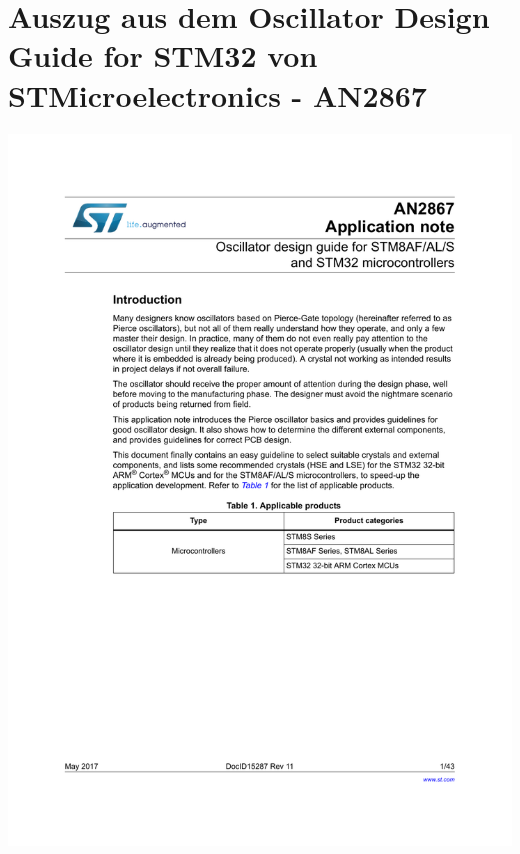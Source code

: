 \section{Auszug aus dem Oscillator Design Guide for STM32 von STMicroelectronics - AN2867}
\begin{center}
	\includegraphics[page=31,width=0.96\columnwidth]{./datenblaetter/quarzinfo_stm}
\end{center}
